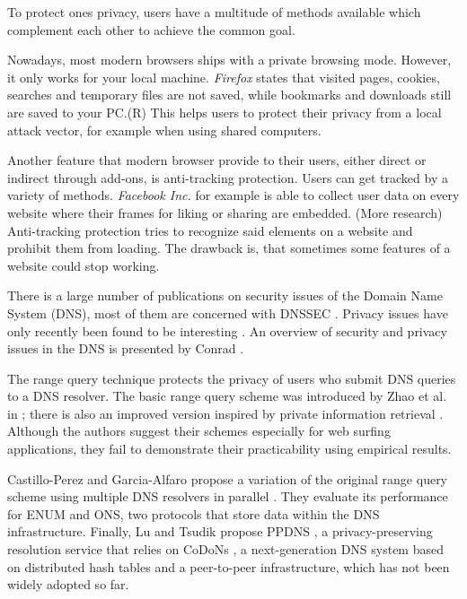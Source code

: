 \documentclass[a4paper]{llncs}
\begin{document}

To protect ones privacy, users have a multitude of methods available which complement each other to achieve the common goal.

Nowadays, most modern browsers ships with a private browsing mode. However, it only works for your local machine. \textit{Firefox} states that visited pages, cookies, searches and temporary files are not saved, while bookmarks and downloads still are saved to your PC.(R) This helps users to protect their privacy from a local attack vector, for example when using shared computers.

Another feature that modern browser provide to their users, either direct or indirect through add-ons, is anti-tracking protection. Users can get tracked by a variety of methods. \textit{Facebook Inc.} for example is able to collect user data on every website where their frames for liking or sharing are embedded. (More research) Anti-tracking protection tries to recognize said elements on a website and prohibit them from loading. The drawback is, that sometimes some features of a website could stop working.





\vspace{20pt}

There is a large number of publications on security issues of the Domain Name System (DNS), most of them are concerned with DNSSEC \cite{rfc4033}. Privacy issues have only recently been found to be interesting \cite{rfc7626}. An overview of security and privacy issues in the DNS is presented by Conrad \cite{Conrad12-dnssecurity}.

The range query technique protects the privacy of users who submit DNS queries to a DNS resolver. The basic range query scheme was introduced by Zhao et al. in \cite{Zhao:2007a}; there is also an improved version \cite{Zhao:2007b} inspired by private information retrieval \cite{Chor:1995}.
Although the authors suggest their schemes especially for web surfing applications, they fail to demonstrate their practicability using empirical results.

Castillo-Perez and Garcia-Alfaro propose a variation of the original range query scheme \cite{Zhao:2007a} using multiple DNS resolvers in parallel \cite{Castillo-Perez:2008,Castillo-Perez:2009}. They evaluate its performance for ENUM and ONS, two protocols that store data within the DNS infrastructure. Finally, Lu and Tsudik propose PPDNS \cite{Lu:2010}, a privacy-preserving resolution service that relies on CoDoNs \cite{RamasubramanianS04-codons}, a next-generation DNS system based on distributed hash tables and a peer-to-peer infrastructure, which has not been widely adopted so far.
\end{document}
